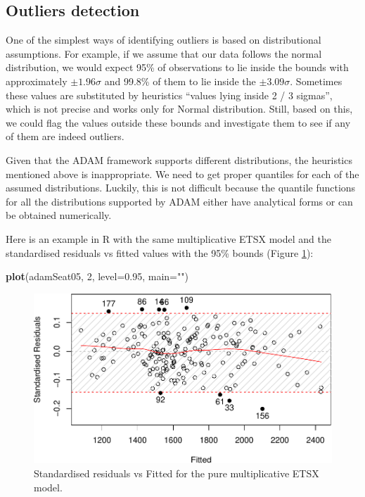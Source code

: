 \documentclass[]{book}
\newenvironment{Shaded}{\begin{snugshade}}{\end{snugshade}}
\newcommand{\DataTypeTok}[1]{\textcolor[rgb]{0.13,0.29,0.53}{#1}}
\newcommand{\DecValTok}[1]{\textcolor[rgb]{0.00,0.00,0.81}{#1}}
\newcommand{\FloatTok}[1]{\textcolor[rgb]{0.00,0.00,0.81}{#1}}
\newcommand{\KeywordTok}[1]{\textcolor[rgb]{0.13,0.29,0.53}{\textbf{#1}}}
\newcommand{\NormalTok}[1]{#1}
\newcommand{\StringTok}[1]{\textcolor[rgb]{0.31,0.60,0.02}{#1}}
\theoremstyle{definition}
\theoremstyle{definition}
\theoremstyle{definition}
\theoremstyle{definition}
\theoremstyle{remark}
\begin{document}
\hypertarget{outliers-detection}{%
\subsection{Outliers detection}\label{outliers-detection}}

One of the simplest ways of identifying outliers is based on distributional assumptions. For example, if we assume that our data follows the normal distribution, we would expect 95\% of observations to lie inside the bounds with approximately \(\pm 1.96\sigma\) and 99.8\% of them to lie inside the \(\pm 3.09 \sigma\). Sometimes these values are substituted by heuristics ``values lying inside 2 / 3 sigmas'', which is not precise and works only for Normal distribution. Still, based on this, we could flag the values outside these bounds and investigate them to see if any of them are indeed outliers.

Given that the ADAM framework supports different distributions, the heuristics mentioned above is inappropriate. We need to get proper quantiles for each of the assumed distributions. Luckily, this is not difficult because the quantile functions for all the distributions supported by ADAM either have analytical forms or can be obtained numerically.

Here is an example in R with the same multiplicative ETSX model and the standardised residuals vs fitted values with the 95\% bounds (Figure \ref{fig:adamSeat05ResidFitted}):

\begin{Shaded}
\begin{Highlighting}[]
\KeywordTok{plot}\NormalTok{(adamSeat05, }\DecValTok{2}\NormalTok{, }\DataTypeTok{level=}\FloatTok{0.95}\NormalTok{, }\DataTypeTok{main=}\StringTok{""}\NormalTok{)}
\end{Highlighting}
\end{Shaded}

\begin{figure}
\centering
\includegraphics{Svetunkov--2022----ADAM_files/figure-latex/adamSeat05ResidFitted-1.pdf}
\caption{\label{fig:adamSeat05ResidFitted}Standardised residuals vs Fitted for the pure multiplicative ETSX model.}
\end{figure}
\end{document}
